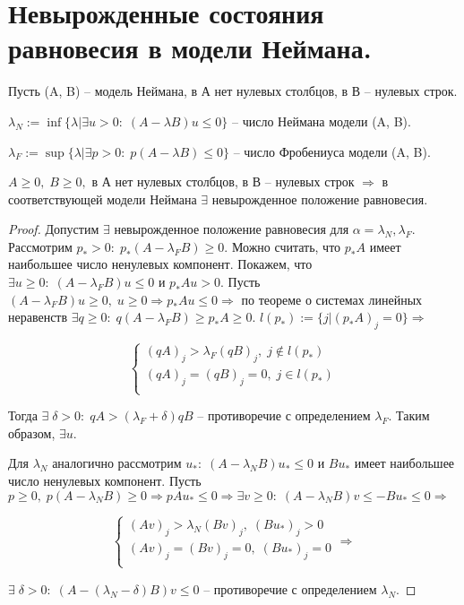 \chapter{Невырожденные состояния равновесия в модели Неймана.}\label{cha:16}

Пусть (A, B) -- модель Неймана, в А нет нулевых столбцов, в В -- нулевых строк.

\begin{sign}
	$\lambda_N := \inf \{ \lambda | \exists u > 0: \; (A - \lambda B)u \leq 0\}$ -- число Неймана модели (A, B).

	$\lambda_F := \sup \{ \lambda | \exists p > 0: \; p(A - \lambda B) \leq 0\}$ -- число Фробениуса модели (A, B).
\end{sign}

\begin{theorem}
	$A \geq 0, \; B \geq 0, $ в А нет нулевых столбцов, в В -- нулевых строк $\Rightarrow $ в соответствующей модели Неймана $\exists$ невырожденное положение равновесия.
\end{theorem}

\begin{proof}
	Допустим $\exists$ невырожденное положение равновесия для $\alpha = \lambda_N, \lambda_F$. Рассмотрим $p_* > 0: \; p_*(A - \lambda_F B) \geq 0.$ Можно считать, что $p_* A$ имеет наибольшее число ненулевых компонент. Покажем, что $\exists u \geq 0: \; (A - \lambda_F B)u \leq 0$ и $p_* A u > 0.$ Пусть $(A - \lambda_F B)u \geq 0, \; u \geq 0 \Rightarrow p_* A u \leq 0 \Rightarrow$ по теореме о системах линейных неравенств $\exists q \geq 0: \; q(A - \lambda_F B) \geq p_*A \geq 0$. $l(p_*) := \{ j | (p_*A)_j = 0\} \Rightarrow$
	
	$$\begin{cases}
		(qA)_j > \lambda_F(qB)_j, \; j \notin l(p_*)\\
		(qA)_j = (qB)_j = 0, \; j \in l(p_*)\\
	\end{cases}$$
 
	Тогда $\exists \; \delta > 0: \; qA > (\lambda_F + \delta)qB$ -- противоречие с определением $\lambda_F$. Таким образом, $\exists u.$

	Для $\lambda_N$ аналогично рассмотрим $u_*: \; (A - \lambda_N B)u_* \leq 0$ и $B u_*$ имеет наибольшее число ненулевых компонент. Пусть $p \geq 0, \; p(A - \lambda_N B) \geq 0 \Rightarrow pAu_* \leq 0 \Rightarrow \exists v \geq 0: \; (A - \lambda_N B)v \leq -Bu_* \leq 0 \Rightarrow$

	$$\begin{cases}
		(Av)_j > \lambda_N(Bv)_j, \; (B u_*)_j > 0\\
		(Av)_j = (Bv)_j = 0, \; (B u_*)_j = 0\\
	\end{cases} \Rightarrow$$

	$\exists \; \delta > 0: \; (A - (\lambda_N - \delta)B)v \leq 0$ -- противоречие с определением $\lambda_N$.
\end{proof}

